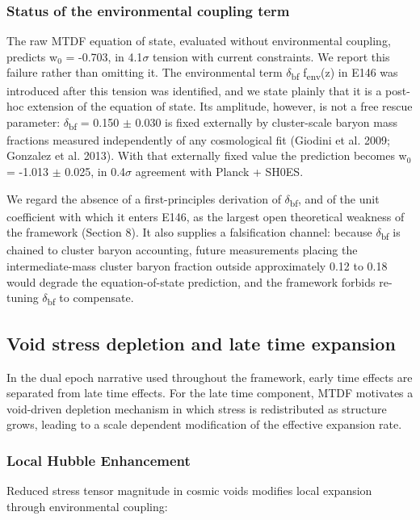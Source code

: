 \documentclass[11pt,a4paper]{article}
\begin{document}
\begin{mdframed}[linecolor=accent,linewidth=0.5pt,backgroundcolor=callout-bg,leftline=true,rightline=true,topline=true,bottomline=true,innerleftmargin=8pt,innerrightmargin=8pt,innertopmargin=6pt,innerbottommargin=6pt]
\subsubsection{Status of the environmental coupling term}
The raw MTDF equation of state, evaluated without environmental coupling, predicts w$_{0}$ = -0.703, in 4.1$\sigma$ tension with current constraints. We report this failure rather than omitting it. The environmental term $\delta$\textsubscript{bf} f\textsubscript{env}(z) in E146 was introduced after this tension was identified, and we state plainly that it is a post-hoc extension of the equation of state. Its amplitude, however, is not a free rescue parameter: $\delta$\textsubscript{bf} = 0.150 $\pm$ 0.030 is fixed externally by cluster-scale baryon mass fractions measured independently of any cosmological fit (Giodini et al. 2009; Gonzalez et al. 2013). With that externally fixed value the prediction becomes w$_{0}$ = -1.013 $\pm$ 0.025, in 0.4$\sigma$ agreement with Planck + SH0ES.

We regard the absence of a first-principles derivation of $\delta$\textsubscript{bf}, and of the unit coefficient with which it enters E146, as the largest open theoretical weakness of the framework (Section 8). It also supplies a falsification channel: because $\delta$\textsubscript{bf} is chained to cluster baryon accounting, future measurements placing the intermediate-mass cluster baryon fraction outside approximately 0.12 to 0.18 would degrade the equation-of-state prediction, and the framework forbids re-tuning $\delta$\textsubscript{bf} to compensate.
\end{mdframed}

\subsection{Void stress depletion and late time expansion}
In the dual epoch narrative used throughout the framework, early time effects are separated from late time effects. For the late time component, MTDF motivates a void-driven depletion mechanism in which stress is redistributed as structure grows, leading to a scale dependent modification of the effective expansion rate.

\subsubsection{Local Hubble Enhancement}
Reduced stress tensor magnitude in cosmic voids modifies local expansion through environmental coupling:
\end{document}
